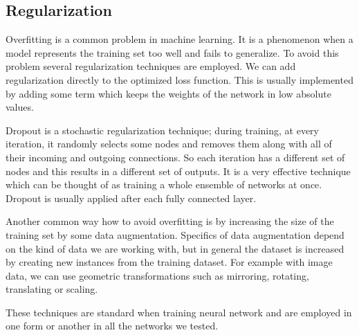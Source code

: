 \subsection{Regularization}
Overfitting is a common problem in machine learning. It is a phenomenon when a model represents the training set too well and fails to generalize. To avoid this problem several regularization techniques are employed. We can add regularization directly to the optimized loss function. This is usually implemented by adding some term which keeps the weights of the network in low absolute values. \par
Dropout \cite{srivastava_dropout:_2014} is a stochastic regularization technique; during training, at every iteration, it randomly selects some nodes and removes them along with all of their incoming and outgoing connections. So each iteration has a different set of nodes and this results in a different set of outputs. It is a very effective technique which can be thought of as training a whole ensemble of networks at once. Dropout is usually applied after each fully connected layer. \par
Another common way how to avoid overfitting is by increasing the size of the training set by some data augmentation. Specifics of data augmentation depend on the kind of data we are working with, but in general the dataset is increased by creating new instances from the training dataset. For example with image data, we can use geometric transformations such as mirroring, rotating, translating or scaling. \par
These techniques are standard when training neural network and are employed in one form or another in all the networks we tested.

